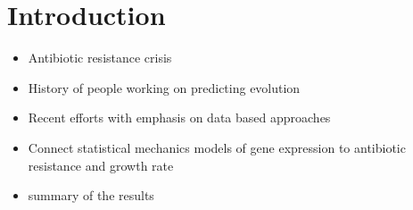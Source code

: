 \section{Introduction}

\begin{itemize}
    \item Antibiotic resistance crisis
    \item History of people working on predicting evolution
    \item Recent efforts with emphasis on data based approaches
    \item Connect statistical mechanics models of gene expression to antibiotic resistance and growth rate
    \item summary of the results
\end{itemize}

